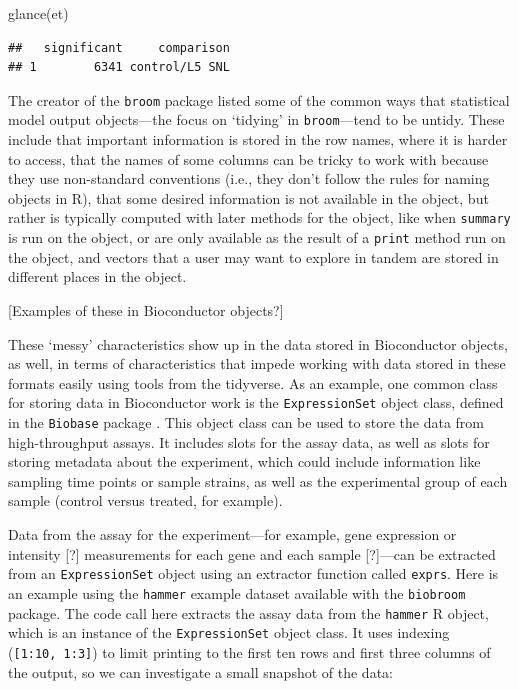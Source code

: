 \documentclass[]{tufte-book}
\newenvironment{Shaded}{}{}
\newcommand{\FunctionTok}[1]{\textcolor[rgb]{0.02,0.16,0.49}{#1}}
\newcommand{\NormalTok}[1]{#1}
\begin{document}
\begin{Shaded}
\begin{Highlighting}[]
\FunctionTok{glance}\NormalTok{(et)}
\end{Highlighting}
\end{Shaded}

\begin{verbatim}
##   significant     comparison
## 1        6341 control/L5 SNL
\end{verbatim}

The creator of the \texttt{broom} package listed some of the common ways that
statistical model output objects---the focus on `tidying' in \texttt{broom}---tend to
be untidy. These include that important information is stored in the row names,
where it is harder to access, that the names of some columns can be tricky to
work with because they use non-standard conventions (i.e., they don't follow the
rules for naming objects in R), that some desired information is not available
in the object, but rather is typically computed with later methods for the
object, like when \texttt{summary} is run on the object, or are only available as the
result of a \texttt{print} method run on the object, and vectors that a user may want
to explore in tandem are stored in different places in the object.
\citep{robinson2014broom}

{[}Examples of these in Bioconductor objects?{]}

These `messy' characteristics show up in the data stored in Bioconductor
objects, as well, in terms of characteristics that impede working with
data stored in these formats easily using tools from the tidyverse.
As an example, one common class for storing data in Bioconductor work is
the \texttt{ExpressionSet} object class, defined in the \texttt{Biobase} package \citep{biobase}.
This object class can be used to store the data from high-throughput
assays. It includes slots for the assay data, as well as slots
for storing metadata about the experiment, which could include information
like sampling time points or sample strains, as well as the experimental
group of each sample (control versus treated, for example).

Data from the assay for the experiment---for example, gene expression
or intensity {[}?{]} measurements for each gene and each sample {[}?{]}---can be
extracted from an \texttt{ExpressionSet} object using an extractor function
called \texttt{exprs}. Here is an example using the \texttt{hammer} example dataset
available with the \texttt{biobroom} package. The code call here extracts the
assay data from the \texttt{hammer} R object, which is an instance of the
\texttt{ExpressionSet} object class. It uses indexing (\texttt{{[}1:10,\ 1:3{]}}) to limit
printing to the first ten rows and first three columns of the output, so
we can investigate a small snapshot of the data:
\end{document}
